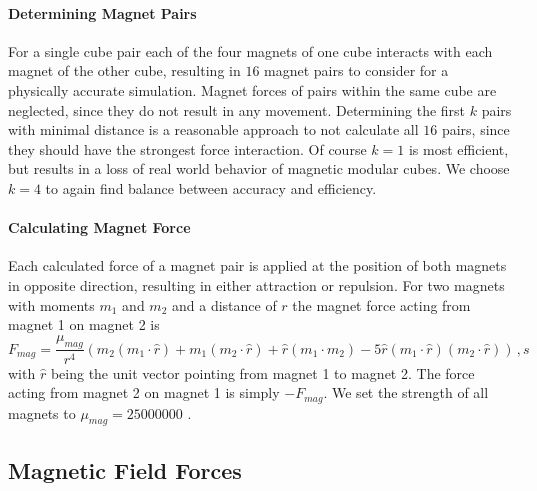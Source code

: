 \paragraph{Determining Magnet Pairs}

For a single cube pair each of the four magnets of one cube interacts with each magnet of the other cube, resulting in $16$ magnet pairs to consider for a physically accurate simulation.
Magnet forces of pairs within the same cube are neglected, since they do not result in any movement.
Determining the first $k$ pairs with minimal distance is a reasonable approach to not calculate all $16$ pairs, since they should have the strongest force interaction.
Of course $k=1$ is most efficient, but results in a loss of real world behavior of magnetic modular cubes.
We choose $k=4$ to again find balance between accuracy and efficiency.

\paragraph{Calculating Magnet Force}

Each calculated force of a magnet pair is applied at the position of both magnets in opposite direction, resulting in either attraction or repulsion.
For two magnets with moments $m_1$ and $m_2$ and a distance of $r$ the magnet force acting from magnet 1 on magnet 2 is
\begin{equation}
F_\textit{mag} = \frac{\mu_\textit{mag}}{r^4} (m_2(m_1 \cdotp \hat{r}) + m_1(m_2 \cdotp \hat{r}) + \hat{r}(m_1 \cdotp m_2) - 5\hat{r}(m_1 \cdotp \hat{r})(m_2 \cdotp \hat{r})) \, ,s
\end{equation}
with $\hat{r}$ being the unit vector pointing from magnet 1 to magnet 2.
The force acting from magnet 2 on magnet 1 is simply $-F_\textit{mag}$.
We set the strength of all magnets to $\mu_{mag} = 25000000$ \cite{levitt2013}. 


\subsection{Magnetic Field Forces}
\label{sec:force_field}

